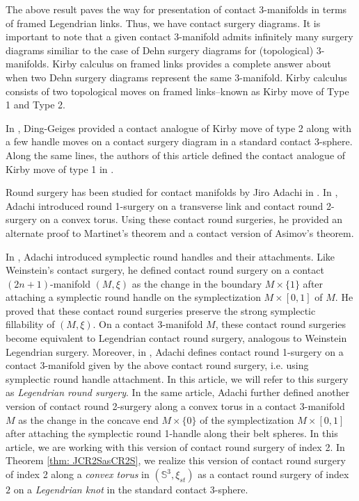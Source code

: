 \documentclass{amsart}
\theoremstyle{plain}
\theoremstyle{remark}
\theoremstyle{definition}
\newcommand{\s}{\mathbb{S}}
\begin{document}
The above result paves the way for presentation of contact 3-manifolds in terms of framed Legendrian links. Thus, we have contact surgery diagrams. It is important to note that a given contact 3-manifold admits infinitely many surgery diagrams similiar to the case of Dehn surgery diagrams for (topological) 3-manifolds. Kirby calculus on framed links provides a complete answer about when two Dehn surgery diagrams represent the same 3-manifold. Kirby calculus consists of two topological moves on framed links--known as Kirby move of Type 1 and Type 2.

In \cite{DG2}, Ding-Geiges provided a contact analogue of Kirby move of type 2 along with a few handle moves on a contact surgery diagram in a standard contact 3-sphere. 
Along the same lines, the authors of this article defined the contact analogue of Kirby move of type 1 in \cite{PD-CFKM}. 


Round surgery has been studied for contact manifolds by Jiro Adachi in \cite{Jiro, Jiro17, Jiro19}.
In \cite{Jiro17}, Adachi introduced round 1-surgery on a transverse link and contact round 2-surgery on a convex torus. Using these contact round surgeries, he provided an alternate proof to Martinet's theorem and a contact version of Asimov's theorem.

In \cite{Jiro}, Adachi introduced symplectic round handles and their attachments. 
Like Weinstein's contact surgery, he defined contact round surgery on a contact $(2n+1)$-manifold $\left(M, \xi \right)$ as the change in the boundary $M\times \{1\}$ after attaching a symplectic round handle on the symplectization $M\times [0,1]$ of $M$. 
He proved that these contact round surgeries preserve the strong symplectic fillability of $\left(M, \xi \right)$. 
On a contact 3-manifold $M$, these contact round surgeries become equivalent to Legendrian contact round surgery, analogous to Weinstein Legendrian surgery.  
Moreover, in \cite{Jiro19}, Adachi defines contact round 1-surgery on a contact 3-manifold given by the above contact round surgery, i.e. using symplectic round handle attachment. 
In this article, we will refer to this surgery as \textit{Legendrian round surgery}.
In the same article, Adachi further defined another version of contact round 2-surgery along a convex torus in a contact 3-manifold $M$ as the change in the concave end $M\times \{0\}$ of the symplectization $M\times [0,1]$ after attaching the symplectic round 1-handle along their belt spheres. 
In this article, we are working with this version of contact round surgery of index 2. 
In Theorem \ref{thm: JCR2SasCR2S}, we realize this version of contact round surgery of index 2 along a \emph{convex torus} in $\left(\s^3, \xi_{st}\right)$ as a contact round surgery of index $2$ on a \emph{Legendrian knot} in the standard contact 3-sphere.
\end{document}
